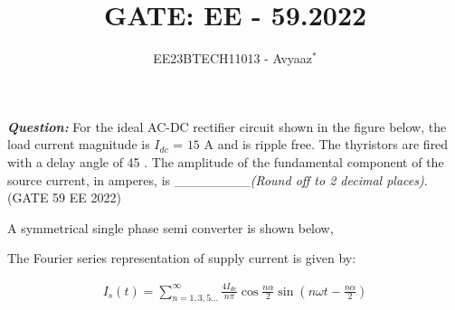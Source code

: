 \documentclass[journal,12pt,onecolumn]{IEEEtran}
\theoremstyle{remark}
\begin{document}

\vspace{3cm}

\title{GATE: EE - 59.2022}
\author{EE23BTECH11013 - Avyaaz$^{*}$%
}
\maketitle

\renewcommand{\thefigure}{\arabic{figure}}
\renewcommand{\thetable}{\arabic{table}}

\large\textbf{\textsl{Question:}}
For the ideal AC-DC rectifier circuit shown in the figure below, the load current
magnitude is $I_{dc}$ = $15$ A and is ripple free. The thyristors are fired with a delay angle
of 45\degree
. The amplitude of the fundamental component of the source current, in
amperes, is \_\_\_\_\_\_\_\_{\em (Round off to 2
decimal places)}. \hfill(GATE 59 EE 2022)
\begin{figure}[!h]
\centering

\end{figure}

\solution

\begin{table}[htbp]
\setlength{\extrarowheight}{4pt}
\setlength{\tabcolsep}{3pt}
\centering

\caption{}
\label{tab:inputs.EE.59.2022}
\end{table}
A symmetrical single phase semi converter is shown below,

\begin{figure}[!h]
\centering
 
\end{figure}
The Fourier series representation of supply current is given by:

\begin{align}
I_{s}(t) = \sum_{n=1,3,5...}^{\infty} \frac{4I_{dc}}{n\pi}\cos{\frac{n\alpha}{2}}\sin{\left(n\omega t - \frac{n\alpha}{2}\right)}
\end{align}


\end{document}
